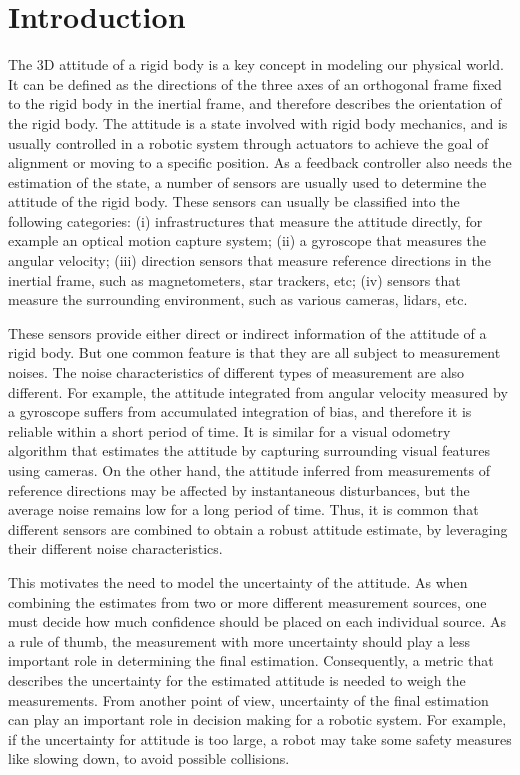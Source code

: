 
\chapter{Introduction} \label{chap:introduction}

\glsaddall

The 3D attitude of a rigid body is a key concept in modeling our physical world.
It can be defined as the directions of the three axes of an orthogonal frame fixed to the rigid body in the inertial frame, and therefore describes the orientation of the rigid body.
The attitude is a state involved with rigid body mechanics, and is usually controlled in a robotic system through actuators to achieve the goal of alignment or moving to a specific position.
As a feedback controller also needs the estimation of the state, a number of sensors are usually used to determine the attitude of the rigid body.
These sensors can usually be classified into the following categories:
(i) infrastructures that measure the attitude directly, for example an optical motion capture system;
(ii) a gyroscope that measures the angular velocity;
(iii) direction sensors that measure reference directions in the inertial frame, such as magnetometers, star trackers, etc;
(iv) sensors that measure the surrounding environment, such as various cameras, lidars, etc.

These sensors provide either direct or indirect information of the attitude of a rigid body.
But one common feature is that they are all subject to measurement noises.
The noise characteristics of different types of measurement are also different.
For example, the attitude integrated from angular velocity measured by a gyroscope suffers from accumulated integration of bias, and therefore it is reliable within a short period of time.
It is similar for a visual odometry algorithm that estimates the attitude by capturing surrounding visual features using cameras.
On the other hand, the attitude inferred from measurements of reference directions may be affected by instantaneous disturbances, but the average noise remains low for a long period of time.
Thus, it is common that different sensors are combined to obtain a robust attitude estimate, by leveraging their different noise characteristics.

This motivates the need to model the uncertainty of the attitude.
As when combining the estimates from two or more different measurement sources, one must decide how much confidence should be placed on each individual source.
As a rule of thumb, the measurement with more uncertainty should play a less important role in determining the final estimation.
Consequently, a metric that describes the uncertainty for the estimated attitude is needed to weigh the measurements.
From another point of view, uncertainty of the final estimation can play an important role in decision making for a robotic system.
For example, if the uncertainty for attitude is too large, a robot may take some safety measures like slowing down, to avoid possible collisions.

